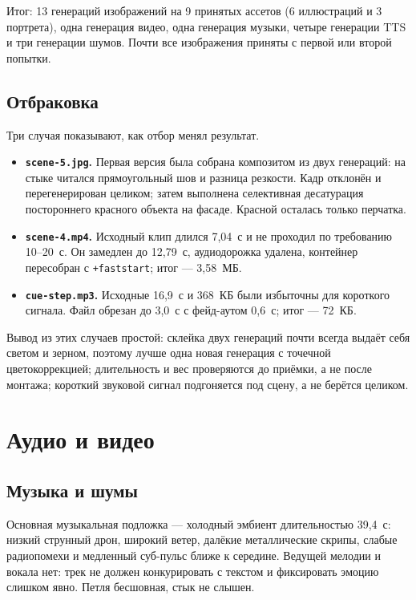 \documentclass[12pt, a4paper]{article}
\begin{document}
Итог: 13 генераций изображений на 9 принятых ассетов (6 иллюстраций и 3 портрета), одна генерация видео, одна генерация музыки, четыре генерации TTS и три генерации шумов. Почти все изображения приняты с первой или второй попытки.


\subsection{Отбраковка}
Три случая показывают, как отбор менял результат.

\begin{itemize}
\setlength{\itemsep}{2pt}
    \item \textbf{\texttt{scene-5.jpg}.} Первая версия была собрана композитом из двух генераций: на стыке читался прямоугольный шов и разница резкости. Кадр отклонён и перегенерирован целиком; затем выполнена селективная десатурация постороннего красного объекта на фасаде. Красной осталась только перчатка.
    \item \textbf{\texttt{scene-4.mp4}.} Исходный клип длился 7{,}04~с и не проходил по требованию 10--20~с. Он замедлен до 12{,}79~с, аудиодорожка удалена, контейнер пересобран с \texttt{+faststart}; итог --- 3{,}58~МБ.
    \item \textbf{\texttt{cue-step.mp3}.} Исходные 16{,}9~с и 368~КБ были избыточны для короткого сигнала. Файл обрезан до 3{,}0~с с фейд-аутом 0{,}6~с; итог --- 72~КБ.
\end{itemize}

Вывод из этих случаев простой: склейка двух генераций почти всегда выдаёт себя светом и зерном, поэтому лучше одна новая генерация с точечной цветокоррекцией; длительность и вес проверяются до приёмки, а не после монтажа; короткий звуковой сигнал подгоняется под сцену, а не берётся целиком.

\section{Аудио и видео}

\subsection{Музыка и шумы}
Основная музыкальная подложка --- холодный эмбиент длительностью 39{,}4~с: низкий струнный дрон, широкий ветер, далёкие металлические скрипы, слабые радиопомехи и медленный суб-пульс ближе к середине. Ведущей мелодии и вокала нет: трек не должен конкурировать с текстом и фиксировать эмоцию слишком явно. Петля бесшовная, стык не слышен.
\end{document}
